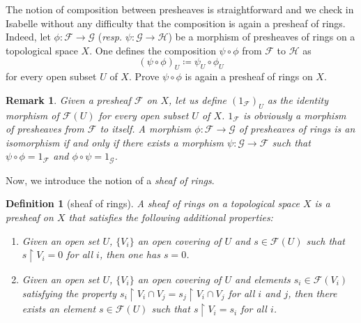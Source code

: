 \documentclass[12pt]{scrartcl}
\newtheorem{definition}[proposition]{Definition}
\newtheorem{remark}[proposition]{Remark}
\begin{document}

The notion of composition between presheaves is straightforward and we check in Isabelle without any difficulty that the composition is again a presheaf of rings. \\
Indeed,	let $\phi: \mathscr{F} \rightarrow \mathscr{G}$ (\textit{resp.} $\psi: \mathscr{G} \rightarrow \mathscr{H}$) be a morphism of presheaves of rings on a topological space $X$. One defines the composition $\psi \circ \phi$ from $\mathscr{F}$ to $\mathscr{H}$ as 
	\[
	(\psi \circ \phi)_U \coloneqq \psi_U \circ \phi_U
	\]
	for every open subset $U$ of $X$. Prove $\psi \circ \phi$ is again a presheaf of rings on $X$.


\begin{remark}
	Given a presheaf $\mathscr{F}$ on $X$, let us define $(1_{\mathscr{F}})_U$ as the identity morphism of $\mathscr{F}(U)$ for every open subset $U$ of $X$. $1_{\mathscr{F}}$ is obviously a morphism of presheaves from $\mathscr{F}$ to itself. A morphism $\phi: \mathscr{F} \rightarrow \mathscr{G}$ of presheaves of rings is an isomorphism if and only if there exists a morphism $\psi: \mathscr{G} \rightarrow \mathscr{F}$ such that $\psi \circ \phi = 1_{\mathscr{F}}$ and $\phi \circ \psi = 1_{\mathscr{G}}$.  
\end{remark}


Now, we introduce the notion of a \emph{sheaf of rings}. 			

\begin{definition}[sheaf of rings]
	A sheaf of rings on a topological space $X$ is a presheaf on $X$ that satisfies the following additional properties:
	\begin{enumerate}
		\item[(locality)] Given an open set $U$, $\lbrace V_i \rbrace$ an open covering of $U$ and $s \in \mathscr{F}(U)$ such that $s \restriction V_i = 0$ for all $i$, then one has $s = 0$.
		\item[(glueing)] Given an open set $U$, $\lbrace V_i \rbrace$ an open covering of $U$ and elements $s_i \in \mathscr{F}(V_i)$ satisfying the property $s_i \restriction V_i \cap V_j = s_j \restriction V_i \cap V_j$ for all $i$ and $j$, then there exists an element $s \in \mathscr{F}(U)$ such that $s \restriction V_i = s_i$ for all $i$.  
	\end{enumerate}	
\end{definition}
\end{document}
